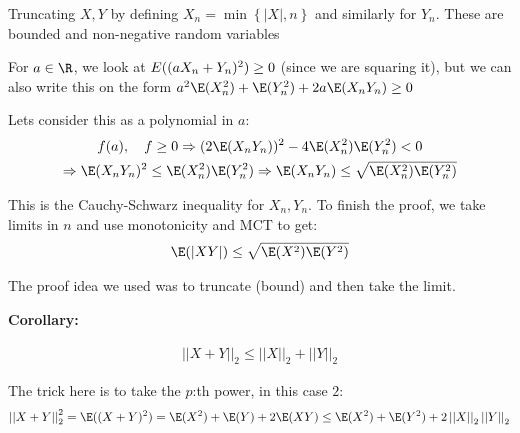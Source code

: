 \par\bigskip
\begin{prf}{}
  Truncating $X,Y$ by defining $X_n = \min\left\{\left|X\right|, n\right\}$ and similarly for $Y_n$. These are bounded and non-negative random variables\par
  \noindent For $a\in\R$, we look at $\\E((aX_n+Y_n)^2)\geq0$ (since we are squaring it), but we can also write this on the form $a^2\E(X_n^2)+\E(Y_n^2)+2a\E(X_nY_n)\geq0$\par
  \noindent Lets consider this as a polynomial in $a$:
  \begin{equation*}
    \begin{gathered}
      f(a), \quad f\geq0\Rightarrow (2\E(X_nY_n))^2-4\E(X_n^2)\E(Y_n^2)<0\\
      \Rightarrow \E(X_nY_n)^2\leq \E(X_n^2)\E(Y_n^2)\Rightarrow \E(X_nY_n)\leq \sqrt{\E(X_n^2)\E(Y_n^2)}
    \end{gathered}
  \end{equation*}
  \par\bigskip
  \noindent This is the Cauchy-Schwarz inequality for $X_n,Y_n$. To finish the proof, we take limits in $n$ and use monotonicity and MCT to get:
  \begin{equation*}
    \begin{gathered}
      \E(\left|XY\right|)\leq \sqrt{\E(X^2)\E(Y^2)}
    \end{gathered}
  \end{equation*}
\end{prf}\par
\noindent The proof idea we used was to truncate (bound) and then take the limit.
\par\bigskip
\noindent\textbf{Corollary:}\par
\begin{equation*}
  \begin{gathered}
    \left|\left|X+Y\right|\right|_2\leq \left|\left|X\right|\right|_2+\left|\left|Y\right|\right|_2
  \end{gathered}
\end{equation*}
\par\bigskip
\begin{prf}[]{}
  The trick here is to take the $p$:th power, in this case $2$:
  \begin{equation*}
    \begin{gathered}
      \left|\left|X+Y\right|\right|_2^2=\E((X+Y)^2) = \E(X^2)+\E(Y)+2\E(XY)\leq \E(X^2)+\E(Y^2)+2\left|\left|X\right|\right|_2\left|\left|Y\right|\right|_2
    \end{gathered}
  \end{equation*}
\end{prf}
